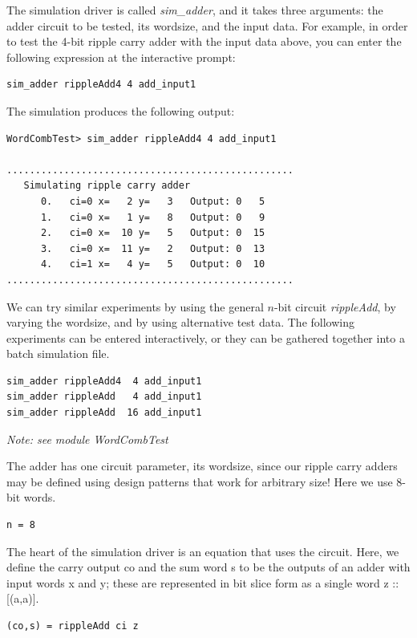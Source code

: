 \documentclass[a4paper,openany,fleqn]{book}
\begin{document}
The simulation driver is called \textit{sim\_adder}, and it takes
three arguments: the adder circuit to be tested, its wordsize, and the
input data.  For example, in order to test the 4-bit ripple carry
adder with the input data above, you can enter the following
expression at the interactive prompt:

\begin{verbatim}
sim_adder rippleAdd4 4 add_input1
\end{verbatim}

The simulation produces the following output:

\begin{verbatim}
WordCombTest> sim_adder rippleAdd4 4 add_input1

..................................................
   Simulating ripple carry adder
      0.   ci=0 x=   2 y=   3   Output: 0   5
      1.   ci=0 x=   1 y=   8   Output: 0   9
      2.   ci=0 x=  10 y=   5   Output: 0  15
      3.   ci=0 x=  11 y=   2   Output: 0  13
      4.   ci=1 x=   4 y=   5   Output: 0  10
..................................................
\end{verbatim}

We can try similar experiments by using the general $n$-bit circuit
\textit{rippleAdd}, by varying the wordsize, and by using alternative
test data.  The following experiments can be entered interactively, or
they can be gathered together into a batch simulation file.

\begin{verbatim}
sim_adder rippleAdd4  4 add_input1
sim_adder rippleAdd   4 add_input1
sim_adder rippleAdd  16 add_input1
\end{verbatim}

\emph{Note:  see module WordCombTest}

The adder has one circuit parameter, its wordsize, since our ripple
carry adders may be defined using design patterns that work for
arbitrary size!  Here we use 8-bit words.

\begin{verbatim}
n = 8
\end{verbatim}

The heart of the simulation driver is an equation that uses the
circuit.  Here, we define the carry output co and the sum word s to be
the outputs of an adder with input words x and y; these are
represented in bit slice form as a single word z :: [(a,a)].

\begin{verbatim}
(co,s) = rippleAdd ci z
\end{verbatim}
\end{document}
